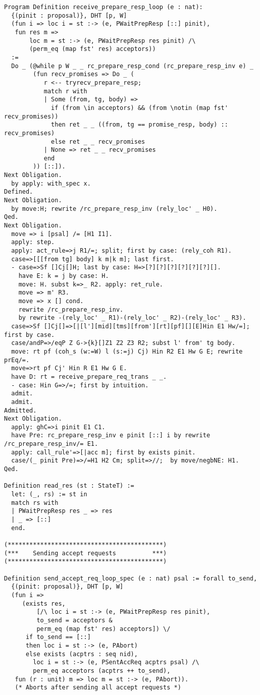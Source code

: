 \begin{landscape}
\begin{multicols*}{2}
\begin{lstlisting}[style=SourceCodeListing]
Program Definition receive_prepare_resp_loop (e : nat):
  {(pinit : proposal)}, DHT [p, W]
  (fun i => loc i = st :-> (e, PWaitPrepResp [::] pinit),
   fun res m =>
       loc m = st :-> (e, PWaitPrepResp res pinit) /\
       (perm_eq (map fst' res) acceptors))
  :=
  Do _ (@while p W _ _ rc_prepare_resp_cond (rc_prepare_resp_inv e) _
        (fun recv_promises => Do _ (
           r <-- tryrecv_prepare_resp;
           match r with
           | Some (from, tg, body) =>
             if (from \in acceptors) && (from \notin (map fst' recv_promises))
             then ret _ _ ((from, tg == promise_resp, body) :: recv_promises)
             else ret _ _ recv_promises
           | None => ret _ _ recv_promises
           end
        )) [::]).
Next Obligation.
  by apply: with_spec x.
Defined.
Next Obligation.
  by move:H; rewrite /rc_prepare_resp_inv (rely_loc' _ H0).
Qed.
Next Obligation.
  move => i [psal] /= [H1 I1].
  apply: step.
  apply: act_rule=>j R1/=; split; first by case: (rely_coh R1).
  case=>[[[from tg] body] k m|k m]; last first.
  - case=>Sf []Cj[]H; last by case: H=>[?][?][?][?][?][?][].
    have E: k = j by case: H.
    move: H. subst k=>_ R2. apply: ret_rule.
    move => m' R3.
    move => x [] cond.
    rewrite /rc_prepare_resp_inv.
    by rewrite -(rely_loc' _ R1)-(rely_loc' _ R2)-(rely_loc' _ R3).
  case=>Sf []Cj[]=>[|[l'][mid][tms][from'][rt][pf][][E]Hin E1 Hw/=]; first by case.
  case/andP=>/eqP Z G->{k}[]Z1 Z2 Z3 R2; subst l' from' tg body.
  move: rt pf (coh_s (w:=W) l (s:=j) Cj) Hin R2 E1 Hw G E; rewrite prEq/=.
  move=>rt pf Cj' Hin R E1 Hw G E.
  have D: rt = receive_prepare_req_trans _ _.
  - case: Hin G=>/=; first by intuition.
  admit.
  admit.
Admitted.
Next Obligation.
  apply: ghC=>i pinit E1 C1.
  have Pre: rc_prepare_resp_inv e pinit [::] i by rewrite /rc_prepare_resp_inv/= E1.
  apply: call_rule'=>[|acc m]; first by exists pinit.
  case/(_ pinit Pre)=>/=H1 H2 Cm; split=>//;  by move/negbNE: H1.
Qed.

Definition read_res (st : StateT) :=
  let: (_, rs) := st in
  match rs with
  | PWaitPrepResp res _ => res
  | _ => [::]
  end.

(*******************************************)
(***    Sending accept requests          ***)
(*******************************************)

Definition send_accept_req_loop_spec (e : nat) psal := forall to_send,
  {(pinit: proposal)}, DHT [p, W]
  (fun i =>
     (exists res,
         [/\ loc i = st :-> (e, PWaitPrepResp res pinit),
         to_send = acceptors &
         perm_eq (map fst' res) acceptors]) \/
      if to_send == [::]
      then loc i = st :-> (e, PAbort)
      else exists (acptrs : seq nid),
        loc i = st :-> (e, PSentAccReq acptrs psal) /\
        perm_eq acceptors (acptrs ++ to_send),
   fun (r : unit) m => loc m = st :-> (e, PAbort)).
   (* Aborts after sending all accept requests *)


\end{lstlisting}
\end{multicols*}
\end{landscape}
